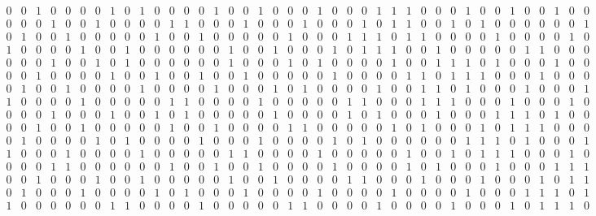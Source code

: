 \documentclass[a4paper,10pt]{article}
\begin{document}
\begin{scriptsize}
\[\begin{array}{rrrrrrrrrrrrrrrrrrrrrrrrrrrrrrrrrrrrrrrr}
0 & 0 & 1 & 0 & 0 & 0 & 0 & 1 & 0 & 1 & 0 & 0 & 0 & 0 & 1 & 0 & 0 & 1 & 0 & 0 & 0 & 1 & 0 & 0 & 0 & 1 & 1 & 1 & 0 & 0 & 0 & 1 & 0 & 0 & 1 & 0 & 0 & 1 & 0 & 0 \\
0 & 0 & 0 & 1 & 0 & 0 & 1 & 0 & 0 & 0 & 0 & 1 & 1 & 0 & 0 & 0 & 1 & 0 & 0 & 0 & 1 & 0 & 0 & 0 & 1 & 0 & 1 & 1 & 0 & 0 & 1 & 0 & 1 & 0 & 0 & 0 & 0 & 0 & 0 & 1 \\
0 & 1 & 0 & 0 & 1 & 0 & 0 & 0 & 0 & 0 & 1 & 0 & 0 & 1 & 0 & 0 & 0 & 0 & 0 & 1 & 0 & 0 & 0 & 1 & 1 & 1 & 0 & 1 & 1 & 0 & 0 & 0 & 0 & 1 & 0 & 0 & 0 & 0 & 1 & 0 \\
1 & 0 & 0 & 0 & 0 & 1 & 0 & 0 & 1 & 0 & 0 & 0 & 0 & 0 & 0 & 1 & 0 & 0 & 1 & 0 & 0 & 0 & 1 & 0 & 1 & 1 & 1 & 0 & 0 & 1 & 0 & 0 & 0 & 0 & 0 & 1 & 1 & 0 & 0 & 0 \\
0 & 0 & 0 & 1 & 0 & 0 & 1 & 0 & 1 & 0 & 0 & 0 & 0 & 0 & 0 & 1 & 0 & 0 & 0 & 1 & 0 & 1 & 0 & 0 & 0 & 0 & 1 & 0 & 0 & 1 & 1 & 1 & 0 & 1 & 0 & 0 & 0 & 1 & 0 & 0 \\
0 & 0 & 1 & 0 & 0 & 0 & 0 & 1 & 0 & 0 & 1 & 0 & 0 & 1 & 0 & 0 & 1 & 0 & 0 & 0 & 0 & 0 & 1 & 0 & 0 & 0 & 0 & 1 & 1 & 0 & 1 & 1 & 1 & 0 & 0 & 0 & 1 & 0 & 0 & 0 \\
0 & 1 & 0 & 0 & 1 & 0 & 0 & 0 & 0 & 1 & 0 & 0 & 0 & 0 & 1 & 0 & 0 & 0 & 1 & 0 & 1 & 0 & 0 & 0 & 0 & 1 & 0 & 0 & 1 & 1 & 0 & 1 & 0 & 0 & 0 & 1 & 0 & 0 & 0 & 1 \\
1 & 0 & 0 & 0 & 0 & 1 & 0 & 0 & 0 & 0 & 0 & 1 & 1 & 0 & 0 & 0 & 0 & 1 & 0 & 0 & 0 & 0 & 0 & 1 & 1 & 0 & 0 & 0 & 1 & 1 & 1 & 0 & 0 & 0 & 1 & 0 & 0 & 0 & 1 & 0 \\
0 & 0 & 0 & 1 & 0 & 0 & 0 & 1 & 0 & 0 & 1 & 0 & 1 & 0 & 0 & 0 & 0 & 0 & 1 & 0 & 0 & 0 & 0 & 1 & 0 & 1 & 0 & 0 & 0 & 1 & 0 & 0 & 0 & 1 & 1 & 1 & 0 & 1 & 0 & 0 \\
0 & 0 & 1 & 0 & 0 & 1 & 0 & 0 & 0 & 0 & 0 & 1 & 0 & 0 & 1 & 0 & 0 & 0 & 0 & 1 & 1 & 0 & 0 & 0 & 0 & 0 & 1 & 0 & 1 & 0 & 0 & 0 & 1 & 0 & 1 & 1 & 1 & 0 & 0 & 0 \\
0 & 1 & 0 & 0 & 0 & 0 & 1 & 0 & 1 & 0 & 0 & 0 & 0 & 1 & 0 & 0 & 0 & 1 & 0 & 0 & 0 & 0 & 1 & 0 & 1 & 0 & 0 & 0 & 0 & 0 & 0 & 1 & 1 & 1 & 0 & 1 & 0 & 0 & 0 & 1 \\
1 & 0 & 0 & 0 & 1 & 0 & 0 & 0 & 0 & 1 & 0 & 0 & 0 & 0 & 0 & 1 & 1 & 0 & 0 & 0 & 0 & 1 & 0 & 0 & 0 & 0 & 0 & 1 & 0 & 0 & 1 & 0 & 1 & 1 & 1 & 0 & 0 & 0 & 1 & 0 \\
0 & 0 & 0 & 1 & 1 & 0 & 0 & 0 & 0 & 0 & 0 & 1 & 0 & 0 & 1 & 0 & 0 & 1 & 0 & 0 & 0 & 0 & 1 & 0 & 0 & 0 & 0 & 1 & 0 & 1 & 0 & 0 & 0 & 1 & 0 & 0 & 0 & 1 & 1 & 1 \\
0 & 0 & 1 & 0 & 0 & 0 & 1 & 0 & 0 & 1 & 0 & 0 & 0 & 0 & 0 & 1 & 0 & 0 & 1 & 0 & 0 & 0 & 0 & 1 & 1 & 0 & 0 & 0 & 1 & 0 & 0 & 0 & 1 & 0 & 0 & 0 & 1 & 0 & 1 & 1 \\
0 & 1 & 0 & 0 & 0 & 1 & 0 & 0 & 0 & 0 & 1 & 0 & 1 & 0 & 0 & 0 & 1 & 0 & 0 & 0 & 0 & 1 & 0 & 0 & 0 & 0 & 1 & 0 & 0 & 0 & 0 & 1 & 0 & 0 & 0 & 1 & 1 & 1 & 0 & 1 \\
1 & 0 & 0 & 0 & 0 & 0 & 0 & 1 & 1 & 0 & 0 & 0 & 0 & 1 & 0 & 0 & 0 & 0 & 0 & 1 & 1 & 0 & 0 & 0 & 0 & 1 & 0 & 0 & 0 & 0 & 1 & 0 & 0 & 0 & 1 & 0 & 1 & 1 & 1 & 0
\end{array}
\]
\end{scriptsize}
\end{document}
